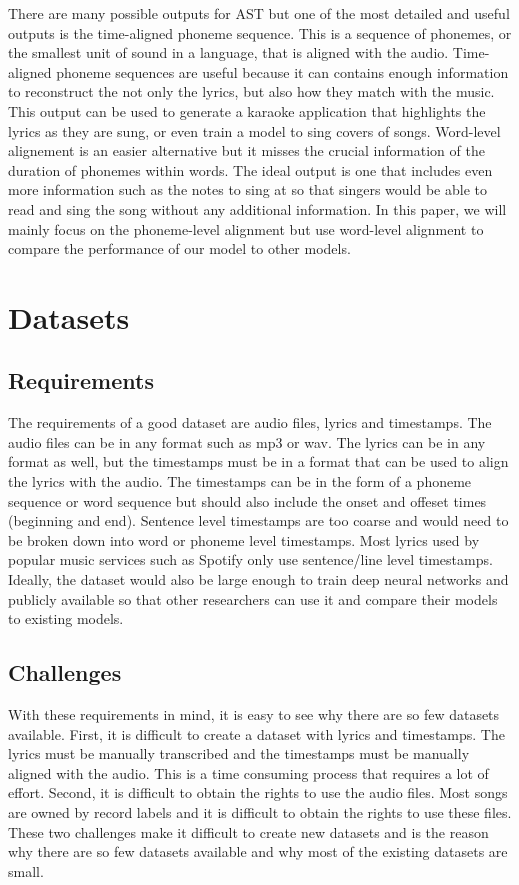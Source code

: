 \documentclass[12pt]{article}
\begin{document}
\begin{multicols*}{2}
There are many possible outputs for AST but one of the most detailed and useful outputs is the
time-aligned phoneme sequence. This is a sequence of phonemes, or the smallest unit of sound in a
language, that is aligned with the audio. Time-aligned phoneme sequences are useful because it can contains enough
information to reconstruct the not only the lyrics, but also how they match with the music. This
output can be used to generate a karaoke application that highlights the lyrics as they are sung,
or even train a model to sing covers of songs. Word-level alignement is an easier alternative but it
misses the crucial information of the duration of phonemes within words. The ideal output is one that includes even more information
such as the notes to sing at so that singers would be able to read and sing the song without any
additional information. In this paper, we will mainly focus on the phoneme-level alignment but use
word-level alignment to compare the performance of our model to other models.


\section{Datasets}

\subsection{Requirements}
The requirements of a good dataset are audio files, lyrics and timestamps. The audio files can be
in any format such as mp3 or wav. The lyrics can be in any format as well, but the timestamps must
be in a format that can be used to align the lyrics with the audio. The timestamps can be in the
form of a phoneme sequence or word sequence but should also include the onset and offeset times
(beginning and end). Sentence level timestamps are too coarse and would need
to be broken down into word or phoneme level timestamps. Most lyrics used by popular music services
such as Spotify only use sentence/line level timestamps. Ideally, the dataset would also be large
enough to train deep neural networks and publicly available so that other researchers can use it and
compare their models to existing models.

\subsection{Challenges}
With these requirements in mind, it is easy to see why there are so few datasets available. First,
it is difficult to create a dataset with lyrics and timestamps. The lyrics must be manually
transcribed and the timestamps must be manually aligned with the audio. This is a time consuming
process that requires a lot of effort. Second, it is difficult to obtain the rights to use the
audio files. Most songs are owned by record labels and it is difficult to obtain the rights to use
these files. These two challenges make it difficult to create new datasets and is the reason why
there are so few datasets available and why most of the existing datasets are small.


\end{multicols*}
\end{document}
